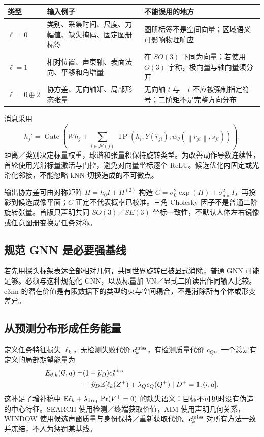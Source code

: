 \documentclass[UTF8,fontset=fandol,11pt,a4paper]{ctexart}
\theoremstyle{plain}
\theoremstyle{definition}
\theoremstyle{remark}
\numberwithin{equation}{section}
\newcommand{\E}{\mathbb E}
\newcommand{\G}{\mathcal G}
\newcommand{\norm}[1]{\left\lVert#1\right\rVert}
\begin{document}
\begin{longtable}{P{22mm}P{61mm}P{63mm}}
\toprule 类型 & 输入例子 & 不能误用的地方\\\midrule\endhead
$\ell=0$ & 类别、采集时间、尺度、力幅值、缺失掩码、固定图册标签 & 图册标签不是空间向量；区域语义可影响物理响应\\
$\ell=1$ & 相对位置、声束轴、表面法向、平移和角增量 & 在 $SO(3)$ 下同为向量；若使用 $O(3)$ 宇称，极向量与轴向量须分开\\
$\ell=0\oplus2$ & 协方差、无向轴矩、局部形态张量 & 无向轴 $t$ 与 $-t$ 不应被强制指定符号；二阶矩不是完整方向分布\\\bottomrule
\end{longtable}

消息采用
\begin{equation}
h_j' =\operatorname{Gate}\!\left(Wh_j+\sum_{i\in\mathcal N(j)}
\operatorname{TP}(h_i,Y(\widehat r_{ji});w_\theta(\norm{r_{ji}},s_{ji}))\right).
\end{equation}
距离／类别决定标量权重，球谐和张量积保持旋转类型\cite{e3nn,e3nndocs}。为改善动作导数连续性，首轮使用光滑标量激活与门控，避免对向量坐标逐个 ReLU。候选优化内固定或光滑化邻接，不能忽略 kNN 切换造成的不可微点。

输出协方差可由对称矩阵 $H=h_0I+H^{(2)}$ 构造 $C=\sigma_0^2\exp(H)+\sigma_{\min}^2I$，再投影到候选成像平面；$C$ 正定不代表概率已校准。三角 Cholesky 因子不是普通二阶旋转张量。首版只声明共同 $SO(3)$／$SE(3)$ 坐标一致性，不默认人体左右镜像或任意图册变换是任务对称。

\subsection{规范 GNN 是必要强基线}
若先用探头标架表达全部相对几何，共同世界旋转已被显式消除，普通 GNN 可能足够。必须与这种规范化 GNN，以及标量加 VN／显式二阶读出作同输入比较。e3nn 的潜在价值是有限数据下的类型约束与空间耦合，不是消除所有个体或形变差异。

\subsection{从预测分布形成任务能量}
定义任务特征损失 $\ell_k$，无检测失败代价 $c_k^{\rm miss}$，有检测质量代价 $c_Q$。一个总是有定义的局部期望能量为
\begin{equation}
\begin{split}
E_{\theta,k}(\G,a)=&(1-\widehat p_D)c_k^{\rm miss}\\
&+\widehat p_D\E[\ell_k(Z^+)+\lambda_Qc_Q(Q^+)\mid D^+=1,\G,a].
\end{split}
\label{eq:skillenergy}
\end{equation}
这补足了增补稿中 $\E\ell_k+\lambda_{\rm drop}\Pr(V^+=0)$ 的缺失语义：目标不可见时没有伪造的中心特征。SEARCH 使用检测／终端获取价值，AIM 使用声明几何关系，WINDOW 使用候选声窗质量与身份保持／重新获取代价。$c_k^{\rm miss}$ 对所有方法一致并冻结，不人为惩罚某基线。
\end{document}
